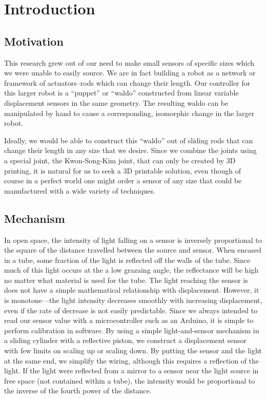 \documentclass[10pt,conference,compsocconf]{IEEEtran}
\begin{document}
\section{Introduction}

\subsection{Motivation}

This research grew out of our need to make small sensors of specific
sizes which we were unable to easily source.  We are in fact building
a robot as a network or framework of actuators--rods which can change their length.
Our controller for this larger robot is a
“puppet” or “waldo” constructed from linear variable displacement sensors in the same
geometry. The resulting waldo can
be manipulated by hand to cause a corresponding, isomorphic change in the larger
robot.

Ideally, we would be able to construct this “waldo” out of sliding
rods that can change their length in any size that we desire. Since we
combine the joints using a special joint, the Kwon-Song-Kim joint,
that can only be created by 3D printing, it is natural for us to seek
a 3D printable solution, even though of course in a perfect world one
might order a sensor of any size that could be manufactured with a
wide variety of techniques.


\subsection{Mechanism}

In open space, the intensity of light falling on a sensor is inversely
proportional to the square of the distance travelled between the
source and sensor. 
When encased in a tube, some fraction of the light
is reflected off the walls of the tube. Since much of this light occurs at the a low
grazaing angle, the reflectance will be high no matter what material is used for the tube.
The light reaching the
sensor is does not have a simple mathematical relationship with
displacement.  However, it is monotone---the light intensity decreases
smoothly with increasing displacement, even if the rate of decrease is
not easily predictable. Since we always intended to read our sensor
value with a microcontroller such as an Arduino, it is simple to
perform calibration in software. By using a simple light-and-sensor
mechanism in a sliding cylinder with a reflective piston, we construct
a displacement sensor with few limits on scaling up or scaling
down. By putting the sensor and the light at the same end, we simplify
the wiring, although this requires a reflection of the light.
If the light were reflected from a mirror to a sensor near the light source
in free space (not contained within a tube), the intensity would be proportional
to the inverse of the fourth power of the distance.
\end{document}
